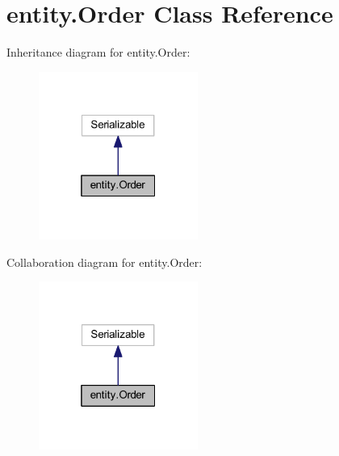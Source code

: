\hypertarget{classentity_1_1_order}{}\section{entity.\+Order Class Reference}
\label{classentity_1_1_order}


Inheritance diagram for entity.\+Order\+:\nopagebreak
\begin{figure}[H]
\begin{center}
\leavevmode
\includegraphics[width=148pt]{classentity_1_1_order__inherit__graph}
\end{center}
\end{figure}


Collaboration diagram for entity.\+Order\+:\nopagebreak
\begin{figure}[H]
\begin{center}
\leavevmode
\includegraphics[width=148pt]{classentity_1_1_order__coll__graph}
\end{center}
\end{figure}
